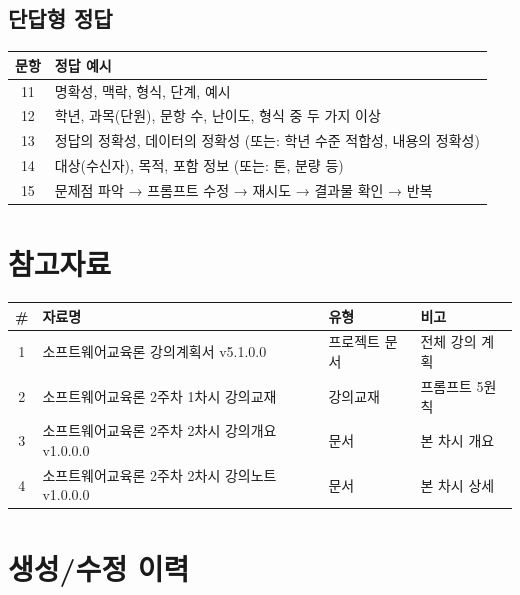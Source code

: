 \documentclass[11pt,a4paper]{article}
\begin{document}
\subsection*{단답형 정답}

\begin{center}
\begin{tabular}{|c|l|}
\hline
\rowcolor{lightblue}
\textbf{문항} & \textbf{정답 예시} \\
\hline
11 & 명확성, 맥락, 형식, 단계, 예시 \\
\hline
12 & 학년, 과목(단원), 문항 수, 난이도, 형식 중 두 가지 이상 \\
\hline
13 & 정답의 정확성, 데이터의 정확성 (또는: 학년 수준 적합성, 내용의 정확성) \\
\hline
14 & 대상(수신자), 목적, 포함 정보 (또는: 톤, 분량 등) \\
\hline
15 & 문제점 파악 → 프롬프트 수정 → 재시도 → 결과물 확인 → 반복 \\
\hline
\end{tabular}
\end{center}

\newpage

\section*{참고자료}

\begin{center}
\begin{tabular}{|c|l|l|l|}
\hline
\rowcolor{lightblue}
\textbf{\#} & \textbf{자료명} & \textbf{유형} & \textbf{비고} \\
\hline
1 & 소프트웨어교육론 강의계획서 v5.1.0.0 & 프로젝트 문서 & 전체 강의 계획 \\
\hline
2 & 소프트웨어교육론 2주차 1차시 강의교재 & 강의교재 & 프롬프트 5원칙 \\
\hline
3 & 소프트웨어교육론 2주차 2차시 강의개요 v1.0.0.0 & 문서 & 본 차시 개요 \\
\hline
4 & 소프트웨어교육론 2주차 2차시 강의노트 v1.0.0.0 & 문서 & 본 차시 상세 \\
\hline
\end{tabular}
\end{center}

\vspace{10mm}

\section*{생성/수정 이력}
\end{document}

